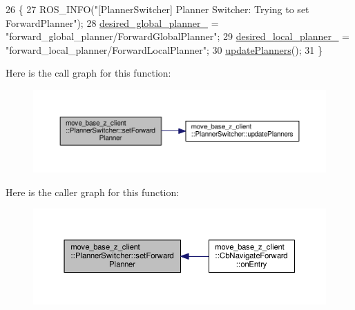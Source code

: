 \begin{DoxyCode}
26 \{
27   ROS\_INFO(\textcolor{stringliteral}{"[PlannerSwitcher] Planner Switcher: Trying to set ForwardPlanner"});
28   \hyperlink{classmove__base__z__client_1_1PlannerSwitcher_a004c15858f0a6b9abcd8211d58a7e34c}{desired\_global\_planner\_} = \textcolor{stringliteral}{"forward\_global\_planner/ForwardGlobalPlanner"};
29   \hyperlink{classmove__base__z__client_1_1PlannerSwitcher_ae47bd6c9c70b27cddcb394f26bb9372d}{desired\_local\_planner\_} = \textcolor{stringliteral}{"forward\_local\_planner/ForwardLocalPlanner"};
30   \hyperlink{classmove__base__z__client_1_1PlannerSwitcher_a189ac8c027169a111c7d8e14d864752f}{updatePlanners}();
31 \}
\end{DoxyCode}


Here is the call graph for this function\+:\nopagebreak
\begin{figure}[H]
\begin{center}
\leavevmode
\includegraphics[width=350pt]{classmove__base__z__client_1_1PlannerSwitcher_a4797022f304538949a2019b351ec47a8_cgraph}
\end{center}
\end{figure}




Here is the caller graph for this function\+:\nopagebreak
\begin{figure}[H]
\begin{center}
\leavevmode
\includegraphics[width=350pt]{classmove__base__z__client_1_1PlannerSwitcher_a4797022f304538949a2019b351ec47a8_icgraph}
\end{center}
\end{figure}


